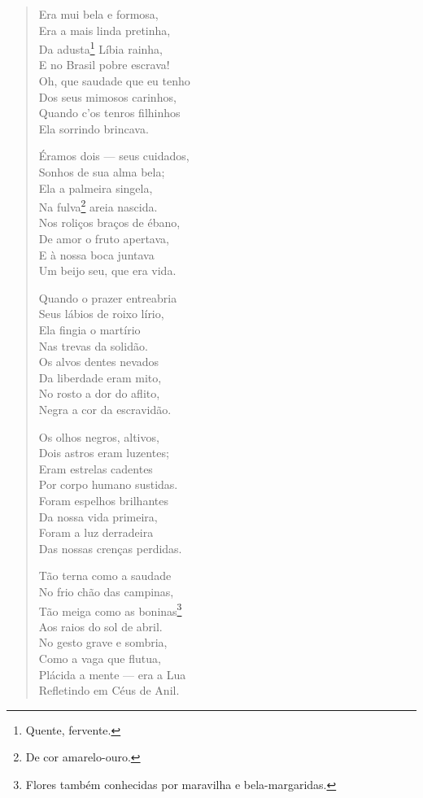 \begin{verse}
Era mui bela e formosa,\\
Era a mais linda pretinha,\\
Da adusta\footnote{Quente, fervente.} Líbia rainha,\\
E no Brasil pobre escrava!\\
Oh, que saudade que eu tenho\\
Dos seus mimosos carinhos,\\
Quando c'os tenros filhinhos\\
Ela sorrindo brincava.

\pagebreak
Éramos dois --- seus cuidados,\\
Sonhos de sua alma bela;\\
Ela a palmeira singela,\\
Na fulva\footnote{De cor amarelo-ouro.} areia nascida.\\
Nos roliços braços de ébano,\\
De amor o fruto apertava,\\
E à nossa boca juntava\\
Um beijo seu, que era vida.

Quando o prazer entreabria\\
Seus lábios de roixo lírio,\\
Ela fingia o martírio\\
Nas trevas da solidão.\\
Os alvos dentes nevados\\
Da liberdade eram mito,\\
No rosto a dor do aflito,\\
Negra a cor da escravidão.

Os olhos negros, altivos,\\
Dois astros eram luzentes;\\
Eram estrelas cadentes\\
Por corpo humano sustidas.\\
Foram espelhos brilhantes\\
Da nossa vida primeira,\\
Foram a luz derradeira\\
Das nossas crenças perdidas.

Tão terna como a saudade\\
No frio chão das campinas,\\
Tão meiga como as boninas\footnote{Flores também conhecidas por maravilha e bela-margaridas.}\\
Aos raios do sol de abril.\\
No gesto grave e sombria,\\
Como a vaga que flutua,\\
Plácida a mente --- era a Lua\\
Refletindo em Céus de Anil.


\end{verse}
